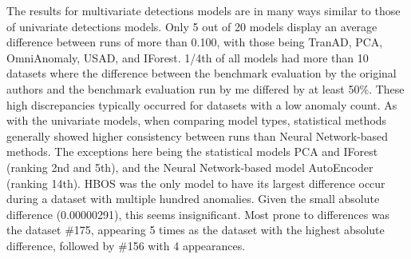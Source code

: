 \documentclass[12pt,oneside]{article}
\begin{document}
The results for multivariate detections models are in many ways similar to those of univariate detections models. Only 5 out of 20 models display an average difference between runs of more than 0.100, with those being TranAD, PCA, OmniAnomaly, USAD, and IForest. 1/4th of all models had more than 10 datasets where the difference between the benchmark evaluation by the original authors and the benchmark evaluation run by me differed by at least 50\%. These high discrepancies typically occurred for datasets with a low anomaly count. As with the univariate models, when comparing model types, statistical methods generally showed higher consistency between runs than Neural Network-based methods. The exceptions here being the statistical models PCA and IForest (ranking 2nd and 5th), and the Neural Network-based model AutoEncoder (ranking 14th). HBOS was the only model to have its largest difference occur during a dataset with multiple hundred anomalies. Given the small absolute difference (0.00000291), this seems insignificant. Most prone to differences was the dataset \#175, appearing 5 times as the dataset with the highest absolute difference, followed by \#156 with 4 appearances. 
\end{document}
